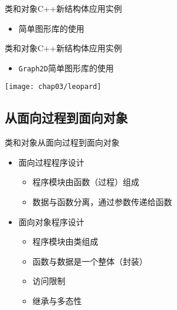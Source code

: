 \begin{frame}[fragile]{类和对象}{C++新结构体应用实例}%
  \begin{itemize}
  \item {}简单图形库的使用\\[2ex]
    \begin{center}
      \begin{minipage}{0.45\linewidth}
      \end{minipage}\qquad
      \begin{minipage}{0.43\linewidth}
      \end{minipage}
    \end{center}    
  \end{itemize}
\end{frame}

\begin{frame}{类和对象}{C++新结构体应用实例}%
  \stretchon
  \begin{itemize}
  \item \texttt{Graph2D}简单图形库的使用    
  \end{itemize}
  \centering
  \texttt{[image: chap03/leopard]}
  \stretchoff
\end{frame}

\subsection[类和对象]{从面向过程到面向对象}
\begin{frame}[fragile]{类和对象}{从面向过程到面向对象}%
  \stretchon
  \begin{itemize}
  \item 面向过程程序设计
    \begin{itemize}
    \item 程序模块由函数（过程）组成
    \item 数据与函数分离，通过参数传递给函数
    \end{itemize}
  \item 面向对象程序设计
    \begin{itemize}
    \item 程序模块由类组成
    \item 函数与数据是一个整体（封装）
    \item 访问限制
    \item 继承与多态性
    \end{itemize}
  \end{itemize}
  \stretchoff
\end{frame}

